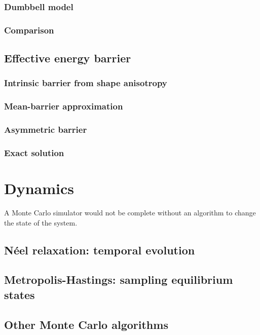 \subsubsection{Dumbbell model}
\subsubsection{Comparison}
\subsection{Effective energy barrier}
\subsubsection{Intrinsic barrier from shape anisotropy}
\subsubsection{Mean-barrier approximation} %
\subsubsection{Asymmetric barrier}
\subsubsection{Exact solution} %

\section{Dynamics}\label{sec:2:Dynamics}
A Monte Carlo simulator would not be complete without an algorithm to change the state of the system.
\subsection{N\'eel relaxation: temporal evolution}
\subsection{Metropolis-Hastings: sampling equilibrium states}
\subsection{Other Monte Carlo algorithms} %


